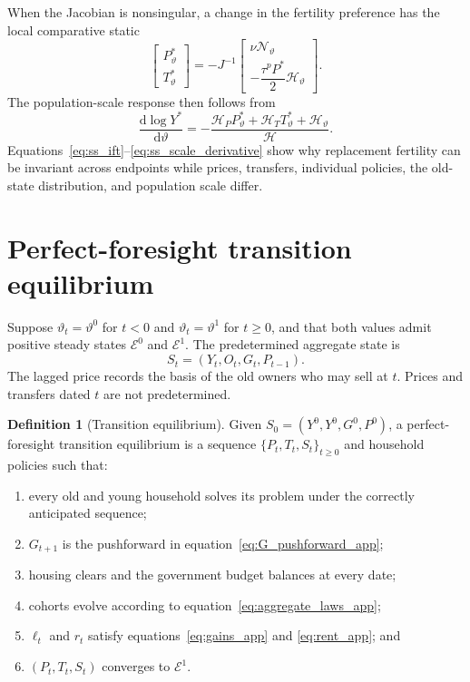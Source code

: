 \documentclass[11pt]{article}
\theoremstyle{definition}
\newtheorem{definition}{Definition}
\theoremstyle{remark}
\newcommand{\dd}{\mathrm d}
\newcommand{\mcN}{\mathcal N}
\newcommand{\mcH}{\mathcal H}
\begin{document}
When the Jacobian is nonsingular, a change in the fertility preference has the
local comparative static
\begin{equation}
 \begin{bmatrix}P_\vartheta^*\\ T_\vartheta^*\end{bmatrix}
 =-J^{-1}
 \begin{bmatrix}
 \nu\mcN_\vartheta\\[2pt]
 -\dfrac{\tau^pP^*}{2}\mcH_\vartheta
 \end{bmatrix}.
 \label{eq:ss_ift}
\end{equation}
The population-scale response then follows from
\begin{equation}
 \frac{\dd\log Y^*}{\dd\vartheta}
 =-\frac{
 \mcH_P P_\vartheta^*+\mcH_T T_\vartheta^*+\mcH_\vartheta
 }{\mcH}.
 \label{eq:ss_scale_derivative}
\end{equation}
Equations~\eqref{eq:ss_ift}--\eqref{eq:ss_scale_derivative} show why replacement
fertility can be invariant across endpoints while prices, transfers, individual
policies, the old-state distribution, and population scale differ.

\section{Perfect-foresight transition equilibrium}

Suppose $\vartheta_t=\vartheta^0$ for $t<0$ and
$\vartheta_t=\vartheta^1$ for $t\geq0$, and that both values admit positive
steady states $\mathcal E^0$ and $\mathcal E^1$.  The predetermined aggregate
state is
\begin{equation}
 S_t=(Y_t,O_t,G_t,P_{t-1}).
 \label{eq:predetermined_state}
\end{equation}
The lagged price records the basis of the old owners who may sell at $t$.
Prices and transfers dated $t$ are not predetermined.

\begin{definition}[Transition equilibrium]
Given $S_0=(Y^0,Y^0,G^0,P^0)$, a perfect-foresight transition equilibrium is a
sequence $\{P_t,T_t,S_t\}_{t\geq0}$ and household policies such that:
\begin{enumerate}
 \item every old and young household solves its problem under the correctly
 anticipated sequence;
 \item $G_{t+1}$ is the pushforward in equation~\eqref{eq:G_pushforward_app};
 \item housing clears and the government budget balances at every date;
 \item cohorts evolve according to equation~\eqref{eq:aggregate_laws_app};
 \item $\ell_t$ and $r_t$ satisfy equations~\eqref{eq:gains_app} and
 \eqref{eq:rent_app}; and
 \item $(P_t,T_t,S_t)$ converges to $\mathcal E^1$.
\end{enumerate}
\end{definition}
\end{document}
